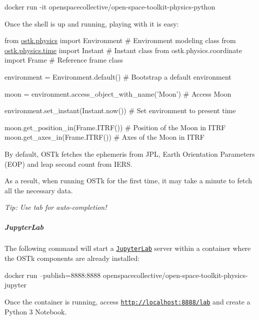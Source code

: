 \begin{DoxyCode}
docker run -it openspacecollective/open-space-toolkit-physics-python
\end{DoxyCode}


Once the shell is up and running, playing with it is easy\+:


\begin{DoxyCode}
\textcolor{keyword}{from} \hyperlink{namespaceostk_1_1physics}{ostk.physics} \textcolor{keyword}{import} Environment \textcolor{comment}{# Environment modeling class}
\textcolor{keyword}{from} \hyperlink{namespaceostk_1_1physics_1_1time}{ostk.physics.time} \textcolor{keyword}{import} Instant \textcolor{comment}{# Instant class}
\textcolor{keyword}{from} ostk.physics.coordinate \textcolor{keyword}{import} Frame \textcolor{comment}{# Reference frame class}

environment = Environment.default() \textcolor{comment}{# Bootstrap a default environment}

moon = environment.access\_object\_with\_name(\textcolor{stringliteral}{'Moon'}) \textcolor{comment}{# Access Moon}

environment.set\_instant(Instant.now()) \textcolor{comment}{# Set environment to present time}

moon.get\_position\_in(Frame.ITRF()) \textcolor{comment}{# Position of the Moon in ITRF}
moon.get\_axes\_in(Frame.ITRF()) \textcolor{comment}{# Axes of the Moon in ITRF}
\end{DoxyCode}


By default, O\+S\+Tk fetches the ephemeris from J\+PL, Earth Orientation Parameters (E\+OP) and leap second count from I\+E\+RS.

As a result, when running O\+S\+Tk for the first time, it may take a minute to fetch all the necessary data.

{\itshape Tip\+: Use tab for auto-\/completion!}

\subparagraph*{Jupyter\+Lab}

The following command will start a \href{https://jupyterlab.readthedocs.io/en/stable/}{\tt Jupyter\+Lab} server within a container where the O\+S\+Tk components are already installed\+:


\begin{DoxyCode}
docker run --publish=8888:8888 openspacecollective/open-space-toolkit-physics-jupyter
\end{DoxyCode}


Once the container is running, access \href{http://localhost:8888/lab}{\tt http\+://localhost\+:8888/lab} and create a Python 3 Notebook.

